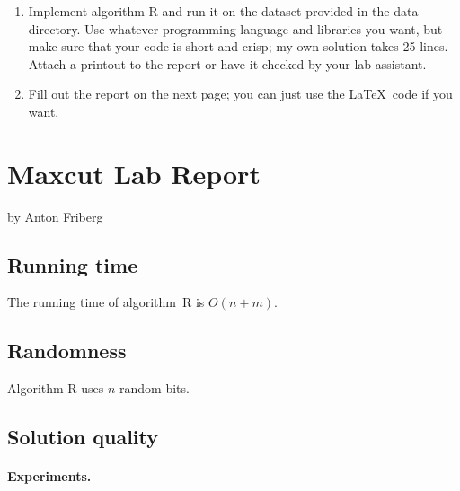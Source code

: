 \documentclass{tufte-handout}
\begin{document}
\begin{enumerate}
\item Implement algorithm R and run it on the dataset provided in
  the data directory.
  Use whatever programming language and libraries you want, but make
  sure that your code is short and crisp; my own solution takes 25
  lines.
  Attach a printout to the report or have it checked by your lab
  assistant.
\item Fill out the report on the next page; you can just use the
  \LaTeX\ code if you want.
\end{enumerate}

\newpage


\newpage
\section{Maxcut Lab Report}


by Anton Friberg

\subsection{Running time}

The running time of algorithm~R is $O(n+m)$.

\subsection{Randomness}

Algorithm R uses $n$ random bits.

\subsection{Solution quality}

\paragraph{Experiments.}
\end{document}
